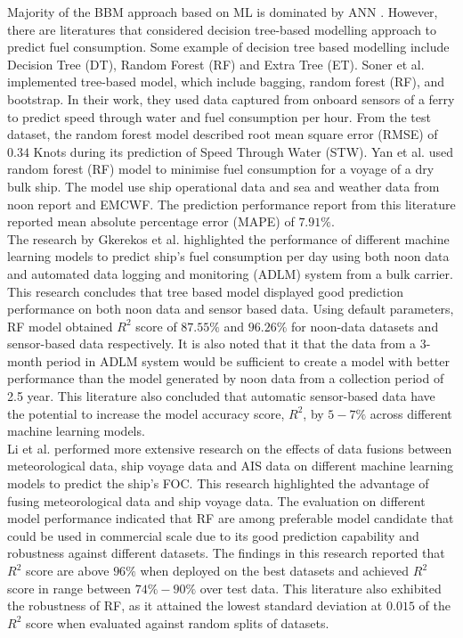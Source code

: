 Majority of the BBM approach based on ML is dominated by ANN \cite{Yan.2021}. However, there are literatures that considered decision tree-based modelling approach to predict fuel consumption. Some example of decision tree based modelling include Decision Tree (DT), Random Forest (RF) and Extra Tree (ET). Soner et al. \cite{Soner.2018} implemented tree-based model, which include bagging, random forest (RF), and bootstrap. In their work, they used data captured from onboard sensors of a ferry to predict speed through water and fuel consumption per hour. From the test dataset, the random forest model described root mean square error (RMSE) of $0.34$ Knots during its prediction of Speed Through Water (STW). Yan et al. \cite{Yan.2020} used random forest (RF) model to minimise fuel consumption for a voyage of a dry bulk ship. The model use ship operational data and sea and weather data from noon report and EMCWF. The prediction performance report from this literature reported mean absolute percentage error (MAPE) of $7.91\%$.\\      

The research by Gkerekos et al. \cite{Gkerekos.2019} highlighted the performance of different machine learning models to predict ship's fuel consumption per day using both noon data and automated data logging and monitoring (ADLM) system from a bulk carrier. This research concludes that tree based model displayed good prediction performance on both noon data and sensor based data. Using default parameters, RF model obtained $R^2$ score of $87.55\%$ and $96.26\%$ for noon-data datasets and sensor-based data respectively. It is also noted that it that the data from a 3-month period in ADLM system would be sufficient to create a model with better performance than the model generated by noon data from a collection period of 2.5 year. This literature also concluded that automatic sensor-based data have the potential to increase the model accuracy score, $R^2$, by $5-7\%$ across different machine learning models.\\

Li et al. \cite{Li.2022} performed more extensive research on the effects of data fusions between meteorological data, ship voyage data and AIS data on different machine learning models to predict the ship's FOC. This research highlighted the advantage of fusing meteorological data and ship voyage data. The evaluation on different model performance indicated that RF are among preferable model candidate that could be used in commercial scale due to its good prediction capability and robustness against different datasets. The findings in this research reported that $R^2$ score are above $96\%$ when deployed on the best datasets and achieved $R^2$ score in range between $74\% - 90\%$ over test data. This literature also exhibited the robustness of RF, as it attained the lowest standard deviation at $0.015$ of the $R^2$ score when evaluated against random splits of datasets.\\

